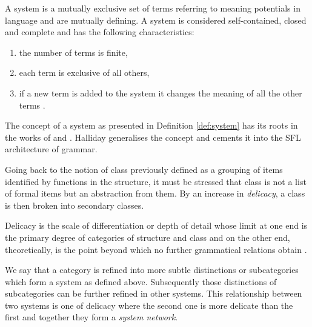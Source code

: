 \begin{definition}[System]\label{def:system}
	A system is a mutually exclusive set of terms referring to meaning potentials in language and are mutually defining. A system is considered self-contained, closed and complete and has the following characteristics:
	\begin{enumerate}
		\item the number of terms is finite,
		\item each term is exclusive of all others,
		\item if a new term is added to the system it changes the meaning of all the other terms \citep[41]{Halliday2002}.
	\end{enumerate}
\end{definition}

The concept of a system as presented in Definition \ref{def:system} has its roots in the works of \citet{Saussure15} and \citet{Hjelmslev53}. Halliday generalises the concept and  cements it into the SFL architecture of grammar.

Going back to the notion of class previously defined as a grouping of items identified by functions in the structure, it must be stressed that class is not a list of formal items but an abstraction from them. By an increase in \textit{delicacy}, a class is then broken into secondary classes. 

\begin{definition}[Delicacy]\label{def:delicacy-sydney}
	Delicacy is the scale of differentiation or depth of detail whose limit at one end is the primary degree of categories of structure  and class and on the other end, theoretically, is the point beyond which no further grammatical relations obtain \citep[58]{Halliday2002}.
\end{definition}

We say that a category is refined into more subtle distinctions or subcategories which form a system as defined above. Subsequently those distinctions of subcategories can be further refined in other systems. This relationship between two systems is one of delicacy where the second one is more delicate than the first and together they form a \textit{system network}.

